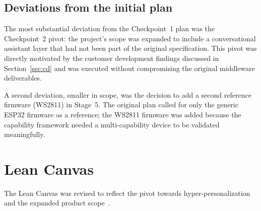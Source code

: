 \documentclass[a4paper,12pt]{article}
\begin{document}
\subsection{Deviations from the initial plan}

The most substantial deviation from the Checkpoint~1 plan was the Checkpoint~2 pivot: the project's scope was expanded to include a conversational assistant layer that had not been part of the original specification. This pivot was directly motivated by the customer development findings discussed in Section~\ref{sec:cd} and was executed without compromising the original middleware deliverables.

A second deviation, smaller in scope, was the decision to add a second reference firmware (WS2811) in Stage~5. The original plan called for only the generic ESP32 firmware as a reference; the WS2811 firmware was added because the capability framework needed a multi-capability device to be validated meaningfully.

\newpage

\section{Lean Canvas}
\label{sec:canvas}

The Lean Canvas was revised to reflect the pivot towards hyper-personalization and the expanded product scope~\cite{maurya}.
\end{document}
